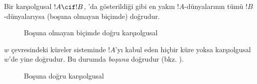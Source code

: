 



Bir karşıolgusal $!A\cif !B$, 'da gösterildiği gibi en
yakın $!A$-dünyalarının tümü $!B$-dünyalarıysa (boşuna olmayan biçimde)
doğrudur.
\begin{figure}
\begin{center}
\caption{Boşuna olmayan biçimde doğru karşıolgusal}
\end{center}
\end{figure}
$w$ çevresindeki küreler sisteminde $!A$'yı kabul eden hiçbir küre yoksa
karşıolgusal $w$'de yine doğrudur. Bu durumda \emph{boşuna} doğrudur
(bkz. ).
\begin{figure}
\begin{center}
\caption{Boşuna doğru karşıolgusal}
\end{center}
\end{figure}

